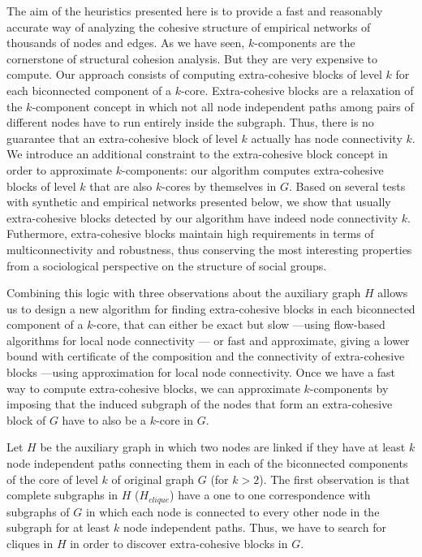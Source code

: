 The aim of the heuristics presented here is to provide a fast and reasonably accurate way of analyzing the cohesive structure of empirical networks of thousands of nodes and edges. As we have seen, $k$-components are the cornerstone of structural cohesion analysis. But they are very expensive to compute. Our approach consists of computing extra-cohesive blocks of level $k$ for each biconnected component of a $k$-core. Extra-cohesive blocks are a relaxation of the $k$-component concept in which not all node independent paths among pairs of different nodes have to run entirely inside the subgraph. Thus, there is no guarantee that an extra-cohesive block of level $k$ actually has node connectivity $k$. We introduce an additional constraint to the extra-cohesive block concept in order to approximate $k$-components: our algorithm computes extra-cohesive blocks of level $k$ that are also $k$-cores by themselves in $G$. Based on several tests with synthetic and empirical networks presented below, we show that usually extra-cohesive blocks detected by our algorithm have indeed node connectivity $k$. Futhermore, extra-cohesive blocks maintain high requirements in terms of multiconnectivity and robustness, thus conserving the most interesting properties from a sociological perspective on the structure of social groups.

Combining this logic with three observations about the auxiliary graph $H$ allows us to design a new algorithm for finding extra-cohesive blocks in each biconnected component of a $k$-core, that can either be exact but slow ---using flow-based algorithms for local node connectivity \citep[Chapter 7]{brandes:2005}--- or fast and approximate, giving a lower bound with certificate of the composition and the connectivity of extra-cohesive blocks ---using \citet{white:2001b} approximation for local node connectivity. Once we have a fast way to compute extra-cohesive blocks, we can approximate $k$-components by imposing that the induced subgraph of the nodes that form an extra-cohesive block of $G$ have to also be a $k$-core in $G$.

Let $H$ be the auxiliary graph in which two nodes are linked if they have at least $k$ node independent paths connecting them in each of the biconnected components of the core of level $k$ of original graph $G$ (for $k > 2$). The first observation is that complete subgraphs in $H$ ($H_{clique}$) have a one to one correspondence with subgraphs of $G$ in which each node is connected to every other node in the subgraph for at least $k$ node independent paths. Thus, we have to search for cliques in $H$ in order to discover extra-cohesive blocks in $G$.

